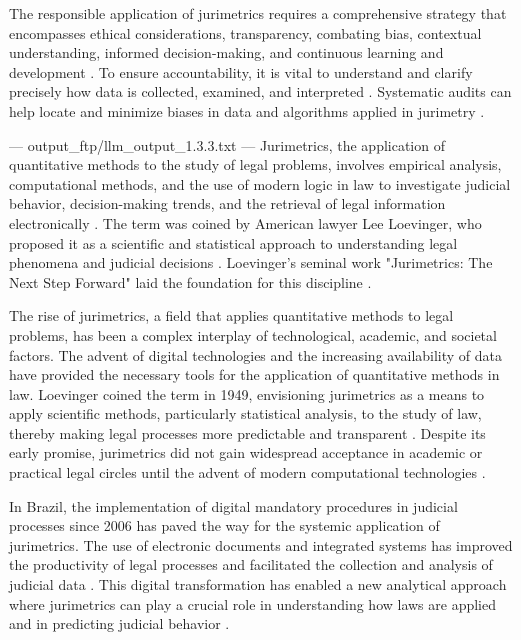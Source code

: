 The responsible application of jurimetrics requires a comprehensive strategy that encompasses ethical considerations, transparency, combating bias, contextual understanding, informed decision-making, and continuous learning and development \cite{10.1590/data.2022.65.3.267,in the lawviewmetadatacitationsimilarpapers2014}. To ensure accountability, it is vital to understand and clarify precisely how data is collected, examined, and interpreted \cite{10.1590/data.2022.65.3.267,in the lawviewmetadatacitationsimilarpapers2014}. Systematic audits can help locate and minimize biases in data and algorithms applied in jurimetry \cite{10.1590/data.2022.65.3.267,in the lawviewmetadatacitationsimilarpapers2014}.


---
output_ftp/llm_output_1.3.3.txt
---
Jurimetrics, the application of quantitative methods to the study of legal problems, involves empirical analysis, computational methods, and the use of modern logic in law to investigate judicial behavior, decision-making trends, and the retrieval of legal information electronically \cite{loevinger1949, nunes2018, de2010}. The term was coined by American lawyer Lee Loevinger, who proposed it as a scientific and statistical approach to understanding legal phenomena and judicial decisions \cite{nunes2018, luvizotto2020}. Loevinger's seminal work "Jurimetrics: The Next Step Forward" laid the foundation for this discipline \cite{nunes2018, zabala2019}.

The rise of jurimetrics, a field that applies quantitative methods to legal problems, has been a complex interplay of technological, academic, and societal factors. The advent of digital technologies and the increasing availability of data have provided the necessary tools for the application of quantitative methods in law. Loevinger coined the term in 1949, envisioning jurimetrics as a means to apply scientific methods, particularly statistical analysis, to the study of law, thereby making legal processes more predictable and transparent \cite{103390fi9040068, zabala2019d}. Despite its early promise, jurimetrics did not gain widespread acceptance in academic or practical legal circles until the advent of modern computational technologies \cite{l2010de}.

In Brazil, the implementation of digital mandatory procedures in judicial processes since 2006 has paved the way for the systemic application of jurimetrics. The use of electronic documents and integrated systems has improved the productivity of legal processes and facilitated the collection and analysis of judicial data \cite{103390fi9040068}. This digital transformation has enabled a new analytical approach where jurimetrics can play a crucial role in understanding how laws are applied and in predicting judicial behavior \cite{103390fi9040068}.

